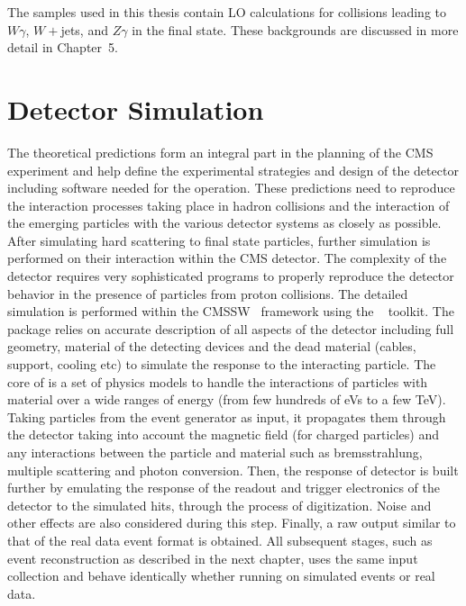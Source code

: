 The \madgraph samples used in this thesis contain LO calculations for \pp collisions leading to $W\gamma$, $W+$jets, and $Z\gamma$ in the final state. 
These backgrounds are discussed in more detail in Chapter~5.

\section{Detector Simulation}
The theoretical predictions form an integral part in the planning of the CMS experiment and help define the experimental strategies
and design of the detector including software needed for the operation. These predictions need to reproduce the interaction processes 
taking place in hadron collisions and the interaction of the emerging particles with the various detector systems as closely as possible.
After simulating hard scattering to final state particles, further simulation is performed on their interaction within the CMS
detector. The complexity of the detector requires very sophisticated programs to properly reproduce the detector behavior in the presence of 
particles from proton collisions. The detailed simulation is performed within the CMSSW~\cite{cmsTDR} framework using the 
\geant~\cite{Agostinelli:2002hh} toolkit. The \geant package relies on accurate description of all aspects of the detector including full geometry, 
material of the detecting devices and the dead material (\eg cables, support, cooling etc) to simulate the response to the interacting particle. The 
core of \geant is a set of physics models to handle the interactions of particles with material over a wide ranges of energy (from few hundreds of eVs 
to a few TeV). Taking particles from the event generator as input, it propagates them through the detector taking into account the magnetic field (for 
charged particles) and any interactions between the particle and material such as bremsstrahlung, multiple 
scattering and photon conversion. Then, the response of detector is built further by emulating the response of the readout
and trigger electronics of the detector to the simulated hits, through the process of digitization. Noise and other effects are also 
considered during this step. Finally, a raw output similar to that of the real data event format is obtained. All subsequent stages, 
such as event reconstruction as described in the next chapter, uses the same input collection and behave identically whether running on simulated 
events or real data.

